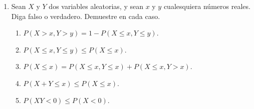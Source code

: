 \documentclass{article}
\begin{document}
\begin{enumerate}
    \item  Sean $X$ y $Y$ dos variables aleatorias, y sean $x$ y $y$ cualesquiera números    reales. Diga falso o verdadero. Demuestre en cada caso.
    \begin{enumerate}
        \item  $P (X > x, Y > y) = 1 - P (X \le x, Y \le y)$.
        \item  $P (X \le x, Y \le y) \le P (X \le x)$.
        \item  $P (X \le x) = P (X \le x, Y \le x) + P (X \le x, Y > x)$.
        \item  $P (X + Y \le x) \le P (X \le x)$.
        \item  $P (XY < 0) \le P (X < 0)$.
    \end{enumerate}
   

\end{enumerate}
\end{document}
